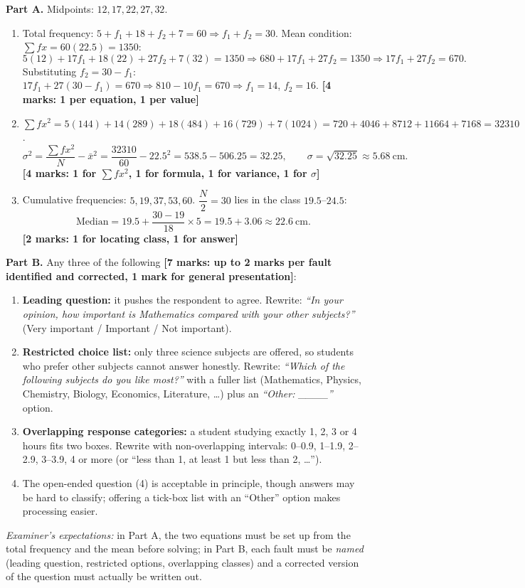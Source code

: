 \documentclass[11pt]{article}
\begin{document}
\begin{corrige}
\textbf{Part A.} Midpoints: $12, 17, 22, 27, 32$.
\begin{enumerate}
\item Total frequency: $5 + f_1 + 18 + f_2 + 7 = 60 \Rightarrow f_1 + f_2 = 30$.
Mean condition: $\sum fx = 60(22.5) = 1350$:
\[
5(12) + 17f_1 + 18(22) + 27f_2 + 7(32) = 1350 \Rightarrow 680 + 17f_1 + 27f_2 = 1350 \Rightarrow 17f_1 + 27f_2 = 670.
\]
Substituting $f_2 = 30 - f_1$: $17f_1 + 27(30 - f_1) = 670 \Rightarrow 810 - 10f_1 = 670 \Rightarrow f_1 = 14$, $f_2 = 16$. \hfill \textbf{[4 marks: 1 per equation, 1 per value]}
\item $\sum fx^2 = 5(144) + 14(289) + 18(484) + 16(729) + 7(1024) = 720 + 4046 + 8712 + 11664 + 7168 = 32310$.
\[
\sigma^2 = \frac{\sum fx^2}{N} - \bar{x}^2 = \frac{32310}{60} - 22.5^2 = 538.5 - 506.25 = 32.25, \qquad \sigma = \sqrt{32.25} \approx 5.68\ \text{cm}.
\]
\textbf{[4 marks: 1 for $\sum fx^2$, 1 for formula, 1 for variance, 1 for $\sigma$]}
\item Cumulative frequencies: $5, 19, 37, 53, 60$. $\dfrac{N}{2} = 30$ lies in the class $19.5$--$24.5$:
\[
\text{Median} = 19.5 + \frac{30 - 19}{18}\times 5 = 19.5 + 3.06 \approx 22.6\ \text{cm}.
\]
\textbf{[2 marks: 1 for locating class, 1 for answer]}
\end{enumerate}
\textbf{Part B.} Any three of the following \textbf{[7 marks: up to 2 marks per fault identified and corrected, 1 mark for general presentation]}:
\begin{enumerate}
\item \textbf{Leading question:} it pushes the respondent to agree. Rewrite: \emph{``In your opinion, how important is Mathematics compared with your other subjects?''} (Very important / Important / Not important).
\item \textbf{Restricted choice list:} only three science subjects are offered, so students who prefer other subjects cannot answer honestly. Rewrite: \emph{``Which of the following subjects do you like most?''} with a fuller list (Mathematics, Physics, Chemistry, Biology, Economics, Literature, \dots) plus an \emph{``Other: \_\_\_\_''} option.
\item \textbf{Overlapping response categories:} a student studying exactly 1, 2, 3 or 4 hours fits two boxes. Rewrite with non-overlapping intervals: 0--0.9, 1--1.9, 2--2.9, 3--3.9, 4 or more (or ``less than 1, at least 1 but less than 2, \dots'').
\item The open-ended question (4) is acceptable in principle, though answers may be hard to classify; offering a tick-box list with an ``Other'' option makes processing easier.
\end{enumerate}
\emph{Examiner's expectations:} in Part A, the two equations must be set up from the total frequency and the mean before solving; in Part B, each fault must be \emph{named} (leading question, restricted options, overlapping classes) and a corrected version of the question must actually be written out.
\end{corrige}
\end{document}
